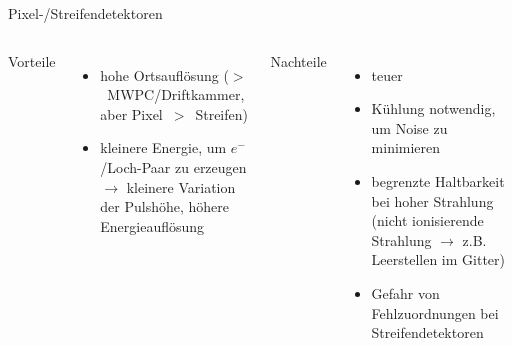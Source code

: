 \begin{frame}{Pixel-/Streifendetektoren}
    \begin{columns}[T]
			Vorteile		
			\begin{itemize}
			  \item hohe Ortsauflösung  ($>$~MWPC/Driftkammer, aber Pixel~$>$~Streifen)
			  \item kleinere Energie, um $e^-$/Loch-Paar zu erzeugen $\rightarrow$ kleinere Variation der
			  Pulshöhe, höhere Energieauflösung
			\end{itemize}	
	    	Nachteile
	    	\begin{itemize}
			  \item teuer
			  \item Kühlung notwendig, um Noise zu minimieren
			  \item begrenzte Haltbarkeit bei hoher Strahlung (nicht ionisierende Strahlung $\rightarrow$
			  z.B. Leerstellen im Gitter)
			  \item Gefahr von Fehlzuordnungen bei Streifendetektoren
			\end{itemize}
    \end{columns}
   \end{frame}
   
